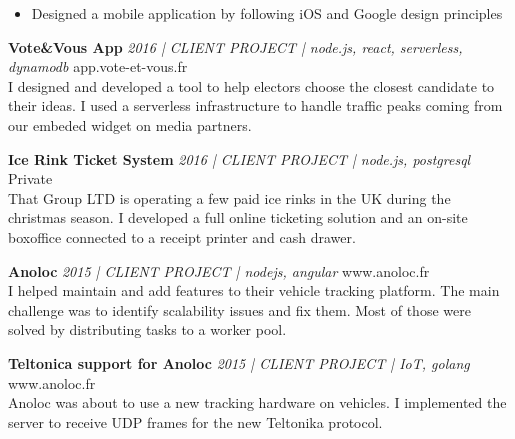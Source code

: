 \documentclass[a4paper]{article}
\begin{document}
\vspace{-\topsep}
\begin{itemize}
    \item Designed a mobile application by following iOS and Google design principles
\end{itemize}
\vspace{-\topsep}

\vspace*{2mm}

{\textbf{Vote\&Vous App} \sl 2016 | CLIENT PROJECT | node.js, react, serverless, dynamodb} \hfill app.vote-et-vous.fr\\
I designed and developed a tool to help electors choose the closest candidate to their ideas.
I used a serverless infrastructure to handle traffic peaks coming from our embeded widget on media partners.
\vspace*{2mm}

{\textbf{Ice Rink Ticket System} \sl 2016 | CLIENT PROJECT | node.js, postgresql} \hfill Private\\
That Group LTD is operating a few paid ice rinks in the UK during the christmas season.
I developed a full online ticketing solution and an on-site boxoffice connected to a receipt printer and cash drawer.
\vspace*{2mm}


{\textbf{Anoloc} \sl 2015 | CLIENT PROJECT | nodejs, angular} \hfill www.anoloc.fr\\
I helped maintain and add features to their vehicle tracking platform.
The main challenge was to identify scalability issues and fix them.
Most of those were solved by distributing tasks to a worker pool.\\
\vspace*{2mm}

{\textbf{Teltonica support for Anoloc} \sl 2015 | CLIENT PROJECT | IoT, golang} \hfill www.anoloc.fr\\
Anoloc was about to use a new tracking hardware on vehicles.
I implemented the server to receive UDP frames for the new Teltonika protocol.
\vspace*{2mm}
\end{document}
